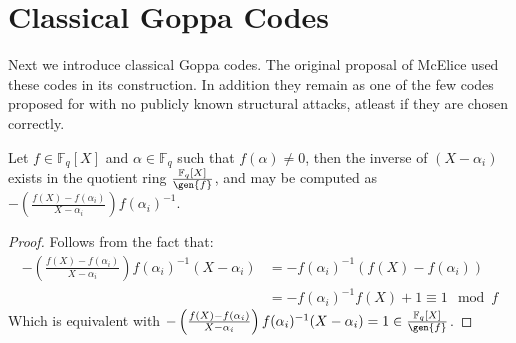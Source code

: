 \chapter{Classical Goppa Codes}
Next we introduce classical Goppa codes. The original proposal of McElice used these codes in its construction. In addition they remain as one of the few codes proposed for with no publicly known structural attacks, atleast if they are chosen correctly.

\begin{theorem}\label{thm:inverse}
  Let $f \in \mathbb{F}_q[X]$ and $\alpha \in \mathbb{F}_q$ such that $f(\alpha) \neq 0$, then the inverse of $(X - \alpha_i)$ exists in the quotient ring $\frac{\mathbb{F}_{q}[X]}{\gen{f}}$, and may be computed as $-\left(\frac{f(X) - f(\alpha_{i})}{X - \alpha_{i}}\right)f(\alpha_{i})^{-1}$.
\end{theorem}

\begin{proof}
  Follows from the fact that:
  \begin{align*}
-\left(\frac{f(X) - f(\alpha_{i})}{X - \alpha_{i}}\right)f(\alpha_{i})^{-1}(X - \alpha_i) &= - f(\alpha_{i})^{-1} (f(X) - f(\alpha_{i})) \\ &= -f(\alpha_{i})^{-1} f(X) + 1 \equiv 1 \mod f
  \end{align*}
  Which is equivalent with $-\left(\frac{f(X) - f(\alpha_{i})}{X - \alpha_{i}}\right)f(\alpha_{i})^{-1}(X - \alpha_i) = 1 \in \frac{\mathbb{F}_{q}[X]}{\gen{f}}$.
\end{proof}

